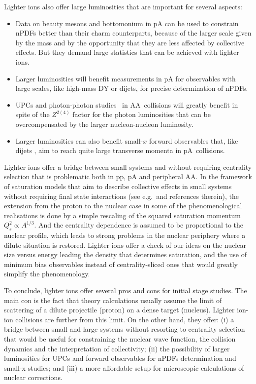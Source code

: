 \documentclass[../report.tex]{subfiles}
\begin{document}
Lighter ions also offer large luminosities that are important for several aspects:
\begin{itemize}
\item Data on beauty mesons and bottomonium in pA can be used to constrain nPDFs \cite{Kusina:2017gkz} better than their charm counterparts, because of the larger scale given by the mass and by the opportunity that they are less affected by collective effects. 
But they demand large statistics that can be achieved with lighter ions.
\item Larger luminosities will benefit measurements in pA for observables with large scales, like high-mass DY or dijets, for precise determination of nPDFs.
\item UPCs and photon-photon studies~\cite{Baltz:2007kq} in AA~collisions will greatly benefit in spite of the $Z^{2(4)}$ factor for the photon luminosities that can be overcompensated by the larger nucleon-nucleon luminosity.
\item Larger luminosities can also benefit small-$x$ forward observables that, like dijets \cite{Dainese:2016gch}, aim to reach quite large transverse momenta in pA~collisions.
\end{itemize}

Lighter ions offer a bridge between small systems and \PbPb without requiring centrality selection that is problematic both in pp, pA and peripheral AA. 
In the framework of saturation models \cite{Gelis:2010nm} that aim to describe collective effects in small systems without requiring final state interactions (see e.g.\,\cite{Kovner:2016wsq} and references therein), the extension from the proton to the nuclear case in some of the phenomenological realisations  is done by a simple rescaling of the squared saturation momentum $Q_s^2\propto A^{1/3}$.
And the centrality dependence is assumed to be proportional to the nuclear profile, which leads to strong problems in the nuclear periphery where a dilute situation is restored. Lighter ions offer a check of our ideas on the
nuclear size versus energy leading
the density that determines saturation, and the use of minimum bias observables
instead of centrality-sliced ones that
would greatly simplify the phenomenology.

To conclude, lighter ions offer several pros and cons for initial stage studies. The main con is the fact that theory calculations usually assume the limit of scattering of a dilute projectile (proton) on a dense target (nucleus). Lighter ion-ion collisions are further from this limit. On the other hand, they offer: (i) a bridge between small and large systems without resorting to
centrality selection that would be useful for constraining the nuclear wave function, the
collision dynamics and the interpretation of collectivity;
(ii) the possibility of larger luminosities for UPCs and forward observables
for nPDFs determination and small-x studies; and (iii)
a more affordable setup for microscopic calculations of nuclear corrections.
\end{document}
